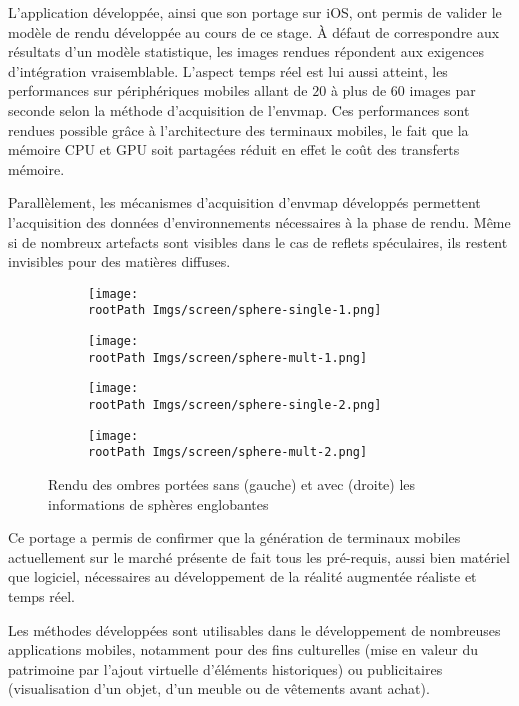 \documentclass[10pt,a4paper,twoside, twocolumn]{report}
\newcommand*{\rootPath}{../}
\begin{document}
\iftwocolumn \begin{multicols}{2} \fi
L’application développée, ainsi que son portage sur iOS, ont permis de valider le modèle de rendu développée au cours de ce stage. À défaut de correspondre aux résultats d’un modèle statistique, les images rendues répondent aux exigences d’intégration vraisemblable. L’aspect temps réel est lui aussi atteint, les performances sur périphériques mobiles allant de $20$ à plus de $60$ images par seconde selon la méthode d'acquisition de l’envmap. Ces performances sont rendues possible grâce à l’architecture des terminaux mobiles, le fait que la mémoire CPU et GPU soit partagées réduit en effet le coût des transferts mémoire.

Parallèlement, les mécanismes d’acquisition d’envmap développés permettent l’acquisition des données d’environnements nécessaires à la phase de rendu. Même si de nombreux artefacts sont visibles dans le cas de reflets spéculaires, ils restent invisibles pour des matières diffuses. 
\iftwocolumn \end{multicols} \fi


\begin{figure*}[!ht]\centering

	\begin{subfigure}[b]{0.45\textwidth}\centering
		\texttt{[image: \\rootPath Imgs/screen/sphere-single-1.png]}
	\end{subfigure}
	\begin{subfigure}[b]{0.45\textwidth}\centering
		\texttt{[image: \\rootPath Imgs/screen/sphere-mult-1.png]}
	\end{subfigure}
	
	\begin{subfigure}[b]{0.45\textwidth}\centering
		\texttt{[image: \\rootPath Imgs/screen/sphere-single-2.png]}
	\end{subfigure}
	\begin{subfigure}[b]{0.45\textwidth}\centering
		\texttt{[image: \\rootPath Imgs/screen/sphere-mult-2.png]}
	\end{subfigure}
	
	\caption{Rendu des ombres portées sans (gauche) et avec (droite) les informations de sphères englobantes}
	\label{fig:result:spheres}
\end{figure*}


\iftwocolumn \begin{multicols}{2} \fi
Ce portage a permis de confirmer que la génération de terminaux mobiles actuellement sur le marché présente de fait tous les pré-requis, aussi bien matériel que logiciel, nécessaires au développement de la réalité augmentée réaliste et temps réel.

Les méthodes développées sont utilisables dans le développement de nombreuses applications mobiles, notamment pour des fins culturelles (mise en valeur du patrimoine par l’ajout virtuelle d’éléments historiques) ou publicitaires (visualisation d’un objet, d’un meuble ou de vêtements avant achat).
\iftwocolumn \end{multicols} \fi
\end{document}
